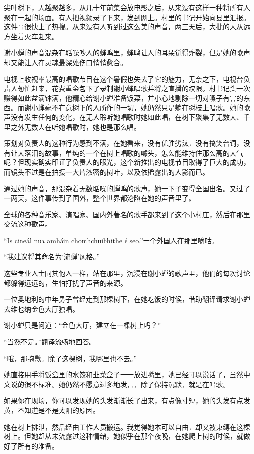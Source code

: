 \documentclass[lang=cn]{elegantpaper}
\begin{document}
尖叶树下，人越聚越多，从几十年前集会放电影之后，从来没有这样一种将所有人聚在一起的场面。有人把视频录了下来，发到网上。村里的书记开始向县里汇报。这件事很快上了热搜。从来没有人听到过这么美的声音，两三天后，大批的人从远方坐着火车赶来。

谢小蝉的声音混杂在聒噪吵人的蝉鸣里，蝉鸣让人的耳朵觉得炸裂，但是她的歌声却又能让人在灵魂最深处伤口悄悄愈合。

电视上收视率最高的唱歌节目在这个暑假也失去了它的魅力，无奈之下，电视台负责人匆忙赶来，花费重金包下了录制谢小蝉唱歌并将之直播的权限。村书记头一次赚得如此盆满钵满，他精心给谢小蝉准备饭菜，并小心地剔除一切对嗓子有害的东西。而谢小蝉毫不在意树下的人所作的一切，她仍然只是躺在树枝上唱歌。她的歌声没有发生任何的变化，在无人聆听她唱歌时她如此唱，在树下聚集了无数人、千里之外无数人在听她唱歌时，她也是那么唱。

策划对负责人的这种行为感到不满，在她看来，没有优胜劣汰，没有搞笑台词，没有让人落泪的故事，单纯的一个在树上唱歌的噱头，怎么能维持住那么高的人气呢？但现实确实印证了负责人的眼光，这个新推出的电视节目取得了巨大的成功，而镜头不过是在拍摄一大片浓密的树叶，以及依稀露出的人影而已。

通过她的声音，那混杂着无数聒噪的蝉鸣的歌声，她一下子变得全国出名。又过了一两天，这件事传到了国外，整个世界都沦陷在她的声音里了。

全球的各种音乐家、演唱家、国内外著名的歌手都来到了这个小村庄，然后在那里交流这种歌声。

“Is cineál nua amháin chomhchuibhithe é seo.”一个外国人在那里嘀咕。

“我建议将其命名为‘流蝉’风格。”

这些专业人士同其他人一样，站在那里，沉浸在谢小蝉的歌声里，他们的每次讨论都躲得远远的，生怕打扰了声音的来源。

一位奥地利的中年男子曾经走到那棵树下，在她吃饭的时候，借助翻译请求谢小蝉去维也纳金色大厅独唱。

谢小蝉只是问道：“金色大厅，建立在一棵树上吗？”

“当然不是。”翻译流畅地回答。

“哦，那抱歉。除了这棵树，我哪里也不去。”

她直接用手将饭盒里的水饺和韭菜盒子一一放进嘴里，她已经可以说话了，虽然中文说的很不标准。她仍然不愿意过多地发言，除了保持沉默，就是在唱歌。

如果你在现场，你可以发现她的头发渐渐长了出来，有点像寸短，她的头发有点发黄，不知道是不是太阳的原因。

她在树上排泄，然后经由工作人员搬运。我觉得她本可以自由，却又被束缚在这棵树上。但她却从未流露过这种情绪，她似乎在那个夜晚，在她爬上树的时候，就做好了所有的准备。
\end{document}

